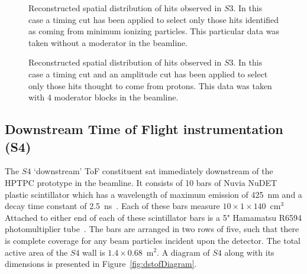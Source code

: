 \begin{figure}[t]
  \begin{minipage}[t]{0.49\textwidth}
    \centering
    \begin{adjustbox}{max totalsize={\textwidth}{.5\textheight},center}
      
    \end{adjustbox}
    \caption{Reconstructed spatial distribution of hits observed in $\mathit{S3}$. In this case a timing cut has been applied to select only those hits identified as coming from minimum ionizing particles. This particular data was taken without a moderator in the beamline.}
    \label{fig:s3XY_pion}
  \end{minipage} 	
  \hfill
  \begin{minipage}[t]{0.49\textwidth}
    \centering
    \begin{adjustbox}{max totalsize={\textwidth}{.5\textheight},center}
      
    \end{adjustbox}
    \caption{Reconstructed spatial distribution of hits observed in $\mathit{S3}$. In this case a timing cut and an amplitude cut has been applied to select only those hits thought to come from protons. This data was taken with 4 moderator blocks in the beamline.}
    \label{fig:s3XY_proton}
  \end{minipage}
\end{figure}


\subsection{Downstream Time of Flight instrumentation (S4)}
\label{subsec:s4Exp}
The $\mathit{S4}$ `downstream' ToF constituent sat immediately downstream of the HPTPC prototype in the beamline. 
It consists of 10 bars of Nuvia NuDET plastic scintillator which has a wavelength of maximum emission of 425~nm and a decay time constant of 2.5~ns~\cite{Nuvia}.
Each of these bars measure $10 \times 1 \times 140$~cm$^3$
Attached to either end of each of these scintillator bars is a 5" Hamamatsu R6594 photomultiplier tube~\cite{Hamamatsu}.
The bars are arranged in two rows of five, such that there is complete coverage for any beam particles incident upon the detector.
The total active area of the $\mathit{S4}$ wall is $1.4 \times 0.68$~m$^2$.
A diagram of $\mathit{S4}$ along with its dimensions is presented in Figure~\ref{fig:dstofDiagram}.

